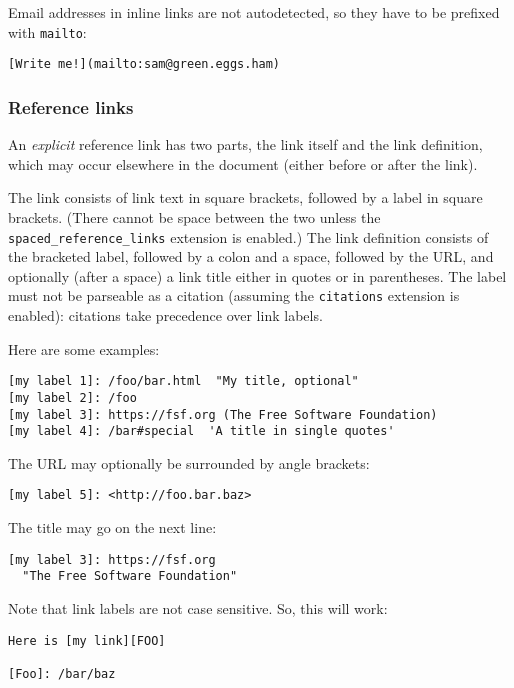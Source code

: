 \documentclass[
]{article}
\begin{document}
Email addresses in inline links are not autodetected, so they have to be
prefixed with \texttt{mailto}:

\begin{verbatim}
[Write me!](mailto:sam@green.eggs.ham)
\end{verbatim}

\hypertarget{reference-links}{%
\subsubsection{Reference links}\label{reference-links}}

An \emph{explicit} reference link has two parts, the link itself and the
link definition, which may occur elsewhere in the document (either
before or after the link).

The link consists of link text in square brackets, followed by a label
in square brackets. (There cannot be space between the two unless the
\texttt{spaced\_reference\_links} extension is enabled.) The link
definition consists of the bracketed label, followed by a colon and a
space, followed by the URL, and optionally (after a space) a link title
either in quotes or in parentheses. The label must not be parseable as a
citation (assuming the \texttt{citations} extension is enabled):
citations take precedence over link labels.

Here are some examples:

\begin{verbatim}
[my label 1]: /foo/bar.html  "My title, optional"
[my label 2]: /foo
[my label 3]: https://fsf.org (The Free Software Foundation)
[my label 4]: /bar#special  'A title in single quotes'
\end{verbatim}

The URL may optionally be surrounded by angle brackets:

\begin{verbatim}
[my label 5]: <http://foo.bar.baz>
\end{verbatim}

The title may go on the next line:

\begin{verbatim}
[my label 3]: https://fsf.org
  "The Free Software Foundation"
\end{verbatim}

Note that link labels are not case sensitive. So, this will work:

\begin{verbatim}
Here is [my link][FOO]

[Foo]: /bar/baz
\end{verbatim}
\end{document}
